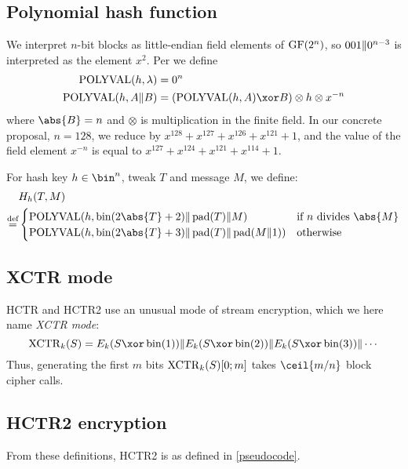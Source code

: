\documentclass[hctr.tex]{subfiles}
\begin{document}
\subsection{Polynomial hash function}\label{hashspec}
We interpret \(n\)-bit blocks as little-endian field elements of \(\operatorname{GF}(2^n)\),
so \(001 \Vert 0^{n-3}\) is interpreted as the element \(x^2\).
Per \cite{aes_gcm_siv} we define
\begin{align*}
    \POLYVAL(h, \lambda) & = 0^n\\
    \POLYVAL(h, A \Concat B) & = (\POLYVAL(h, A) \xor B) \otimes h \otimes x^{-n}
\end{align*}
where \(\abs{B} = n\) and
\(\otimes\) is multiplication in the finite field.
In our concrete proposal, \(n=128\), we reduce by
\(x^{128} + x^{127} + x^{126} + x^{121} + 1\),
and the value of the field element \(x^{-n}\)
is equal to \(x^{127} + x^{124} + x^{121} + x^{114} + 1\).

For hash key \(h \in \bin^n\), tweak \(T\) and message \(M\), we define:
\begin{align*}
    & H_h(T, M) \\
    \defeq & 
    \begin{cases}
        \POLYVAL(h, \fromint(2\abs{T} + 2) \Concat \pad(T) \Concat M) &
        \text{if } n \text{ divides } \abs{M} \\
        \POLYVAL(h, \fromint(2\abs{T} + 3) \Concat \pad(T) \Concat \pad(M \Concat 1)) &
        \text{otherwise}
    \end{cases}
\end{align*}

\subsection{XCTR mode}
HCTR and HCTR2 use an unusual mode of stream encryption,
which we here name \emph{XCTR mode}:
\begin{displaymath}
    \XCTR_k(S) = E_k(S \xor \fromint(1)) \Concat E_k(S \xor \fromint(2)) \Concat E_k(S \xor \fromint(3)) \Concat \cdots
\end{displaymath}
Thus, generating the first \(m\) bits \(\operatorname{XCTR}_k(S)[0; m]\) takes \(\ceil{m/n}\) block cipher calls. 

\subsection{HCTR2 encryption}
From these definitions, HCTR2 is as defined in \autoref{pseudocode}.

\end{document}
